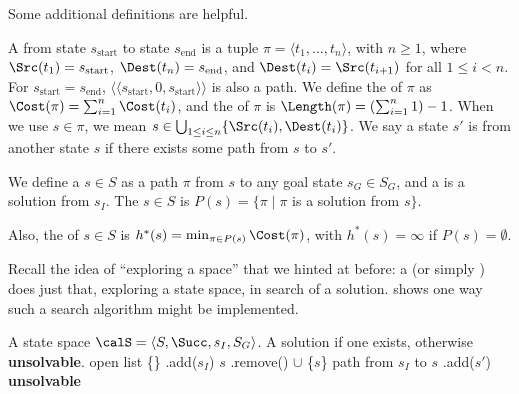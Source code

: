Some additional definitions are helpful.

A  from state $s_\text{start}$ to state $s_\text{end}$ is a tuple $\pi=\langle t_1,\ldots,t_n\rangle$, with $n\geq 1$, where $\Src(t_1)=s_\text{start}$, $\Dest(t_n)=s_\text{end}$, and $\Dest(t_i)=\Src(t_{i+1})$ for all $1\leq i<n$. For $s_\text{start}=s_\text{end}$, $\langle\langle s_\text{start},0,s_\text{start}\rangle\rangle$ is also a path. We define the  of $\pi$ as $\Cost(\pi)=\sum_{i=1}^n\Cost(t_i)$, and the  of $\pi$ is $\Length(\pi)=(\sum_{i=1}^n1)-1$. When we use $s\in\pi$, we mean $s\in\bigcup_{1\leq i\leq n}\{\Src(t_i),\Dest(t_i)\}$. We say a state $s'$ is  from another state $s$ if there exists some path from $s$ to $s'$.

We define a  $s\in S$ as a path $\pi$ from $s$ to any goal state $s_G\in S_G$, and a  is a solution from $s_I$. The  $s\in S$ is $P(s)=\{\pi\mid\pi$ is a solution from $s\}$.

Also, the  of $s\in S$ is $h^*(s)=\min_{\pi\in P(s)}\Cost(\pi)$, with $h^*(s)=\infty$ if $P(s)=\emptyset$.


Recall the idea of ``exploring a space'' that we hinted at before: a  (or simply ) does just that, exploring a state space, in search of a solution.  shows one way such a search algorithm might be implemented.

\begin{algorithm}[H]
    \caption{State space search}
    \label{alg:sss}
    \begin{algorithmic}[1]
        \Require A state space $\calS=\langle S,\Succ,s_I,S_G\rangle$.
        \Ensure A solution if one exists, otherwise \textbf{unsolvable}.
        \State {} \ceq \New open list
        \State {} \ceq \{\}
        \State {}.add($s_I$)
        \State $s$ \ceq {}.remove()
        \State {} \ceq {} $\cup$ \{$s$\}
        \State \Return path from $s_I$ to $s$
        \EndIf
        \State {}.add($s'$)
        \EndFor
        \EndIf
        \EndWhile
        \State \Return \textbf{unsolvable}
    \end{algorithmic}
\end{algorithm}

